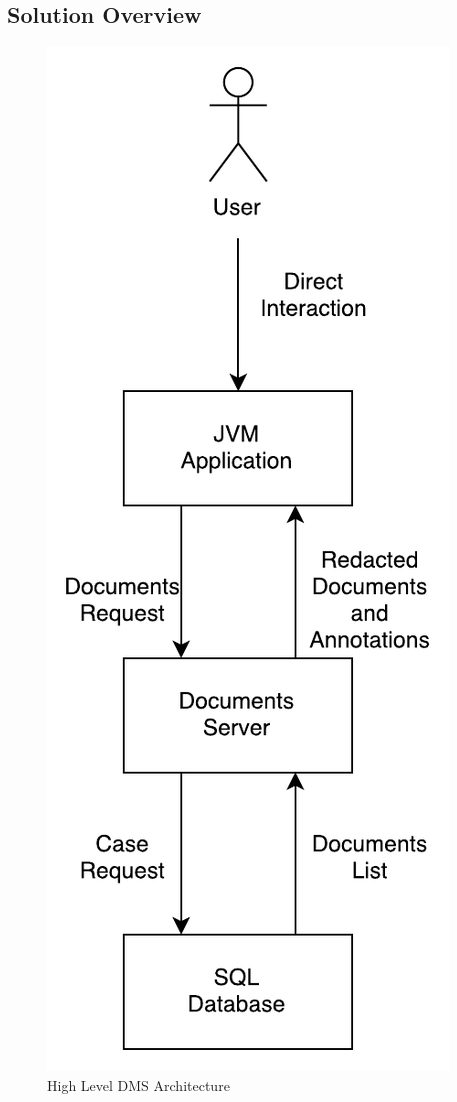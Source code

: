 \subsection{Solution Overview}
\begin{figure}[h]
	\begin{center}
		\includegraphics[scale=0.4]{images/DocumentManagementSystem.pdf}
	\end{center}
	\caption{High Level DMS Architecture}
	\label{fig:dmsArch}
\end{figure}

